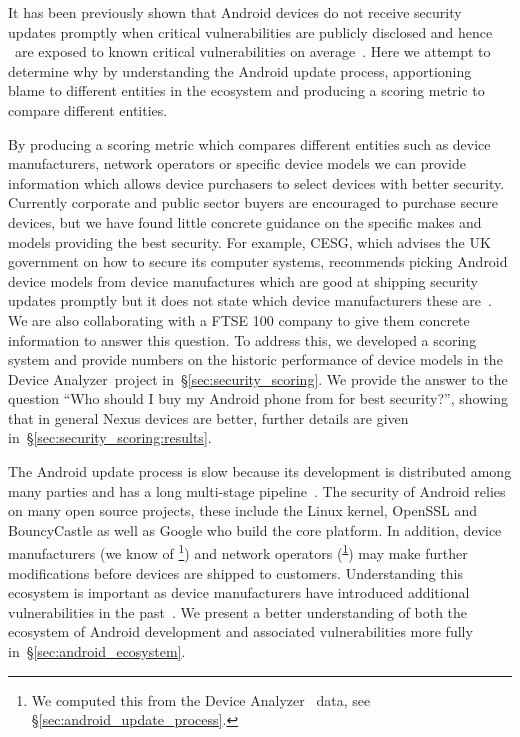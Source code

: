 \documentclass{sig-alternate}
\newcommand{\da}{Device Analyzer}
\newcommand{\dafoot}{\textsuperscript{\ref{foot:dadata}}}
\begin{document}
It has been previously shown that Android devices do not receive security updates promptly when critical vulnerabilities are publicly disclosed and hence \daMeanInsecurityPercNominal\ are exposed to known critical vulnerabilities on average~\cite{androidvulnerabilities.org}.
Here we attempt to determine why by understanding the Android update process, apportioning blame to different entities in the ecosystem and producing a scoring metric to compare different entities.

By producing a scoring metric which compares different entities such as device manufacturers, network operators or specific device models we can provide information which allows device purchasers to select devices with better security.
Currently corporate and public sector buyers are encouraged to purchase secure devices, but we have found little concrete guidance on the specific makes and models providing the best security.
For example, CESG, which advises the UK government on how to secure its computer systems, recommends picking Android device models from device manufactures which are good at shipping security updates promptly but it does not state which device manufacturers these are~\cite{CESG2013}.
We are also collaborating with a FTSE 100 company to give them concrete information to answer this question.
To address this, we developed a scoring system and provide numbers on the historic performance of device models in the \da\ project in~\S\ref{sec:security_scoring}.
We provide the answer to the question ``Who should I buy my Android phone from for best security?'', showing that in general Nexus devices are better, further details are given in~\S\ref{sec:security_scoring:results}.

The Android update process is slow because its development is distributed among many parties and has a long multi-stage pipeline~\cite{HTC2013}.
The security of Android relies on many open source projects, these include the Linux kernel, OpenSSL and BouncyCastle as well as Google who build the core platform.
In addition, device manufacturers (we know of \daNumManufacturers\footnote{\label{foot:dadata}We computed this from the \da~\cite{Wagner2013} data, see \S\ref{sec:android_update_process}.}) and network operators (\daNumOperators\dafoot) may make further modifications before devices are shipped to customers.
Understanding this ecosystem is important as device manufacturers have introduced additional vulnerabilities in the past~\cite{Grace2012}.
We present a better understanding of both the ecosystem of Android development and associated vulnerabilities more fully in~\S\ref{sec:android_ecosystem}.
\end{document}
